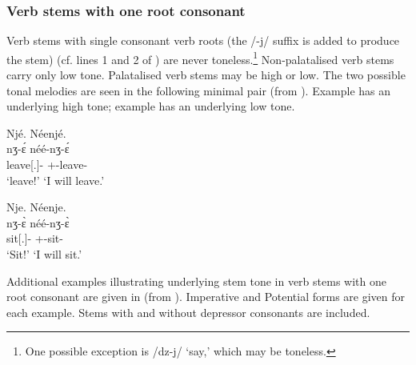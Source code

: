 \subsubsection{Verb stems with one root consonant}\label{sec:6.7.2.1}

Verb stems with single consonant verb roots (the /-j/ suffix is added to produce the stem) (cf. lines 1 and 2 of ) are never toneless.\footnote{One possible exception is /dz-j/ ‘say,’ which may be toneless.} Non-palatalised verb stems carry only low tone. Palatalised verb stems may be high or low.  The two possible tonal melodies are seen in the following minimal pair (from \citealt{FriesenMamalis2008}). Example  has an underlying high tone; example  has an underlying low tone. 

\ea \label{ex:6:19}
Njé. \hspace{63pt}   Néenjé.\\
\gll  nʒ-\'{ɛ}  \hspace{10pt}    néé-nʒ-\'{ɛ}\\
      leave[{\twoS}.{\IMP}]{}-{\CL} \hspace{5pt} {\oneS}+{\POT}-leave{}-{\CL}\\
\glt  ‘leave!’  \hspace{50pt}  ‘I will leave.’
\z

\ea \label{ex:6:20}
Nje.  \hspace{50pt}    Néenje.\\
\gll  nʒ-\`{ɛ}  \hspace{10pt}    néé-nʒ-\`{ɛ}\\
      sit[{\twoS}.{\IMP}]-{\CL} \hspace{5pt} {\oneS}+{\POT}-sit{}-{\CL}\\
\glt  ‘Sit!’ \hspace{50pt}   ‘I will sit.’
\z

Additional examples illustrating underlying stem tone in verb stems with one root consonant are given in  (from \citealt{FriesenMamalis2008}). Imperative and Potential forms are given for each example. Stems with and without depressor consonants are included. 

